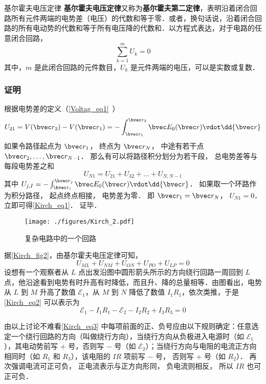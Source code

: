 \begin{theorem}{基尔霍夫电压定律}
\textbf{基尔霍夫电压定律}又称为\textbf{基尔霍夫第二定律}，表明沿着闭合回路所有元件两端的电势差（电压）的代数和等于零．或者，换句话说，沿着闭合回路的所有电动势的代数和等于所有电压降的代数和．以方程式表达，对于电路的任意闭合回路，
\begin{equation}\label{Kirch_eq1}
\sum_{k=1}^m U_k = 0
\end{equation}
其中，$m$ 是此闭合回路的元件数目，$U_k$ 是元件两端的电压，可以是实数或复数．
\end{theorem}

\subsubsection{证明}
根据电势差的定义（\autoref{Voltag_eq1}~）
\begin{equation}
U_{21} = V(\bvec r_2) - V(\bvec r_1) = - \int_{\bvec r_1}^{\bvec r_2} \bvec E_0(\bvec r) \vdot \dd{\bvec r}
\end{equation}
如果令路径起点为 $\bvec r_1$， 终点为 $\bvec r_N$， 中途有若干点 $\bvec r_2, \dots, \bvec r_{N-1}$． 那么有可以将路径积分划分为若干段， 总电势差等与每段电势差之和
\begin{equation}
U_{N1} = U_{21} + U_{32} + \dots + U_{N, N-1}
\end{equation}
其中 $U_{j, I} = - \int_{\bvec r_i}^{\bvec r_{j}} \bvec E_0(\bvec r) \vdot \dd{\bvec r}$．
如果取一个环路作为积分路径， 起点终点相接， 电势差为零． 即 $\bvec r_1 = \bvec r_N$， $U_{N1} = 0$． 立即可得\autoref{Kirch_eq1}． 证毕．

\begin{example}{}
\begin{figure}[ht]
\centering
\texttt{[image: ./figures/Kirch\_2.pdf]}
\caption{复杂电路中的一个回路} \label{Kirch_fig2}
\end{figure}

据\autoref{Kirch_fig2}，由基尔霍夫电压定律可知，
\begin{equation} \label{Kirch_eq2}
U_{M L}+U_{N M}+U_{O N}+U_{P O}+U_{L P}=0
\end{equation}
设想有一个观察者从 $L$ 点出发沿图中圆形箭头所示的方向绕行回路一周回到 $L $ 点，他沿途看到电势有时升高有时降低，而且升、降的总量相等．由图看出，电势从 $L $ 到 $M $ 升高了数值 $\mathscr E_1$，从 $M $ 到 $N $ 降低了数值 $I_1R_1$，依次类推，于是\autoref{Kirch_eq2} 可以表示为
\begin{equation}\label{Kirch_eq3}
\mathscr{E}_{1}-I_{1} R_{1}-\mathscr{E}_{2}-I_{2} R_{2}+I_{3} R_{3}=0
\end{equation}

由以上讨论不难看\autoref{Kirch_eq3} 中每项前面的正、负号应由以下规则确定：任意选定一个绕行回路的方向（叫做绕行方向），当绕行方向从负极进入电源时（如 $\mathscr E_1$），其电动势前写 $+$ 号，否则写 $-$ 号（如 $\mathscr
E_2$）；当绕行方向与电阻的电流正方向相同时（如 $R_1$ 和 $R_3$），该电阻的 $IR$ 项前写 $-$ 号， 否则写 $+$ 号（如 $R_2$）． 再次强调电流可正可负， 正电流表示与正方向形同， 负电流则相反， 所以 $IR$ 也可正可负．
\end{example}

